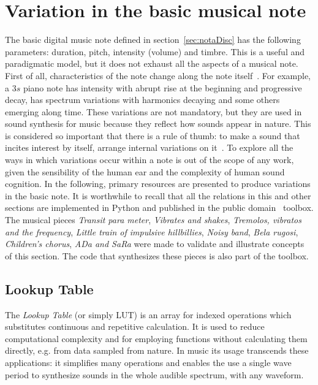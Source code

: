 \section{Variation in the basic musical note}\label{sec:internalVar}\label{sec:varInternas}
The basic digital music note defined in section~\ref{sec:notaDisc} has the following parameters: duration, pitch, intensity (volume) and timbre. This is a useful and paradigmatic model, but it does not exhaust all the aspects of a musical note. First of all, characteristics of the note change along the note itself~\cite{Chowning}. For example, a $3s$ piano note has intensity with abrupt rise at the beginning and progressive decay, has spectrum variations with harmonics decaying and some others emerging along time. These variations are not mandatory, but they are used in sound synthesis for music because they reflect how sounds appear in nature. This is considered so important that there is a rule of thumb: to make a sound that incites interest by itself, arrange internal variations on it~\cite{Roederer}.
To explore all the ways in which variations occur within a note is out of the scope of any work, given the sensibility of the human ear and the complexity of human sound cognition. In the following, primary resources are presented to produce variations in the basic note. It is worthwhile to recall that all the relations in this and other sections are implemented in Python and published in the public domain \massa\ toolbox. The musical pieces \emph{Transit para meter}, \emph{Vibrates and shakes}, \emph{Tremolos, vibratos and the frequency}, \emph{Little train of impulsive hillbillies}, \emph{Noisy band}, \emph{Bela rugosi}, \emph{Children's chorus}, \emph{ADa and SaRa} were made to validate and illustrate concepts of this section. The code that synthesizes these pieces is also part of the toolbox\cite{MASSA}.
 
\subsection{Lookup Table}\label{subsec:lookup}
The \emph{Lookup Table} (or simply LUT) is an array for indexed operations which substitutes continuous and repetitive calculation. It is used to reduce computational complexity and for employing functions without calculating them directly, e.g. from data sampled from nature.
In music its usage transcends these applications: it simplifies many operations and enables the use a single wave period to synthesize sounds in the whole audible spectrum, with any waveform.

